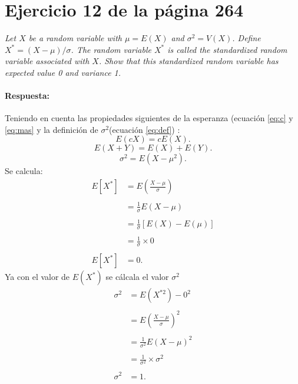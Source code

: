 \documentclass{article}
\begin{document}
\section{Ejercicio 12 de la página 264}    
\emph{Let $X$ be a random variable with $\mu = E(X)$ and $\sigma^2 = V(X)$. Define $X^\ast = (X-\mu)/\sigma$. The random variable $X^\ast$ is called the standardized random variable associated with $X$. Show that this standardized random variable has expected value 0 and variance 1.} 

\paragraph{Respuesta:} Teniendo en cuenta las propiedades siguientes de la esperanza (ecuación \ref{eq:c} y \ref{eq:mas} y la definición de $\sigma^{2}$(ecuación \ref{eq:def}) :
\begin{equation}\label{eq:c}
 E(cX)= cE(X).   
\end{equation}
\begin{equation}\label{eq:mas}
 E(X+Y)= E(X)+ E(Y). 
\end{equation}
\begin{equation}\label{eq:def}
 \sigma^{2}= E(X-\mu^{2}). 
\end{equation}
Se calcula:
\begin{equation}
\begin{array}{ll}
   E[X^{*}] &= E\left(\frac{X-\mu}{\sigma}\right) \\
   &\\
   & = \frac{1}{\sigma}E(X-\mu)  \\
   &\\
   & = \frac{1}{\sigma}\left[E(X) - E(\mu)\right]\\
&\\
   & = \frac{1}{\sigma}\times 0 \\
&\\
   E[X^{*}] & = 0.
      \end{array}
   \end{equation}
Ya con el valor de $E(X^{*})$ se cálcala el valor $\sigma^{2}$
\begin{equation}
\begin{array}{ll}
   \sigma ^{2} & = E(X^{*2})- 0^{2}  \\
   &\\
   &= E\left(\frac{X-\mu}{\sigma}\right)^{2}\\
    &\\
   &=  \frac{1}{\sigma^{2}} E(X-\mu)^{2}\\
   &\\
     &=\frac{1}{\sigma^{2}} \times \sigma^{2}\\
      &\\
   \sigma ^{2} & = 1. 
     \end{array}
   \end{equation}  
   
\newpage


\end{document}
